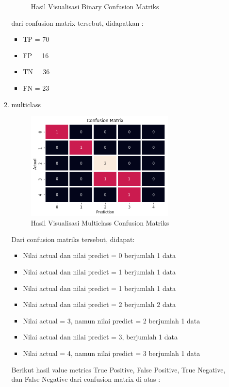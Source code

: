 \begin{enumerate}
\begin{enumerate}
\begin{figure}[H]
    \caption{Hasil Visualisasi Binary Confusion Matriks}
    \label{fig:my_label}
    \end{figure}
    dari confusion matrix tersebut, didapatkan :
    \begin{itemize}
        \item TP = 70
        \item FP = 16
        \item TN = 36
        \item FN = 23
    \end{itemize}
    \item multiclass
    \begin{figure}[H]
    \centering
    \includegraphics[width=0.75\textwidth]{figures/confusion_matrix2.png}
    \caption{Hasil Visualisasi Multiclass Confusion Matriks}
    \label{fig:my_label}
    \end{figure}
    Dari confusion matriks tersebut, didapat:
    \begin{itemize}
        \item Nilai actual dan nilai predict = 0 berjumlah 1 data
        \item Nilai actual dan nilai predict = 1 berjumlah 1 data
        \item Nilai actual dan nilai predict = 1 berjumlah 1 data
        \item Nilai actual dan nilai predict = 2 berjumlah 2 data
        \item Nilai actual = 3, namun nilai predict = 2 berjumlah 1 data
        \item Nilai actual dan nilai predict = 3, berjumlah 1 data
        \item Nilai actual = 4, namun nilai predict = 3 berjumlah 1 data
    \end{itemize}
Berikut hasil value metrics True Positive, False Positive, True Negative, dan False Negative dari confusion matrix di atas :

\end{enumerate}
\end{enumerate}
